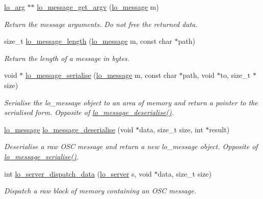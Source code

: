 \begin{DoxyCompactItemize}
\hyperlink{unionlo__arg}{lo\+\_\+arg} $\ast$$\ast$ \hyperlink{group__liblolowlevel_gab28b48cdbefb60eb7e57557ae9d23171}{lo\+\_\+message\+\_\+get\+\_\+argv} (\hyperlink{lo__types_8h_ad126083c98d941f00eb72d1690b38d63}{lo\+\_\+message} m)
\begin{DoxyCompactList}\small\item\em Return the message arguments. Do not free the returned data. \end{DoxyCompactList}\item 
size\+\_\+t \hyperlink{group__liblolowlevel_ga0855039d071b7031727213272857c27e}{lo\+\_\+message\+\_\+length} (\hyperlink{lo__types_8h_ad126083c98d941f00eb72d1690b38d63}{lo\+\_\+message} m, const char $\ast$path)
\begin{DoxyCompactList}\small\item\em Return the length of a message in bytes. \end{DoxyCompactList}\item 
void $\ast$ \hyperlink{group__liblolowlevel_ga5a14045edea33d63792e9a4c82e13b02}{lo\+\_\+message\+\_\+serialise} (\hyperlink{lo__types_8h_ad126083c98d941f00eb72d1690b38d63}{lo\+\_\+message} m, const char $\ast$path, void $\ast$to, size\+\_\+t $\ast$size)
\begin{DoxyCompactList}\small\item\em Serialise the lo\+\_\+message object to an area of memory and return a pointer to the serialised form. Opposite of \hyperlink{group__liblolowlevel_ga2f4644b2a1aae0d0eee456fe93ac158e}{lo\+\_\+message\+\_\+deserialise()}. \end{DoxyCompactList}\item 
\hyperlink{lo__types_8h_ad126083c98d941f00eb72d1690b38d63}{lo\+\_\+message} \hyperlink{group__liblolowlevel_ga2f4644b2a1aae0d0eee456fe93ac158e}{lo\+\_\+message\+\_\+deserialise} (void $\ast$data, size\+\_\+t size, int $\ast$result)
\begin{DoxyCompactList}\small\item\em Deserialise a raw O\+S\+C message and return a new lo\+\_\+message object. Opposite of \hyperlink{group__liblolowlevel_ga5a14045edea33d63792e9a4c82e13b02}{lo\+\_\+message\+\_\+serialise()}. \end{DoxyCompactList}\item 
int \hyperlink{group__liblolowlevel_ga9e96445401c94c3751de27f8db1a0b50}{lo\+\_\+server\+\_\+dispatch\+\_\+data} (\hyperlink{lo__types_8h_a59067bf50cf8abb4371da6f03c9036c9}{lo\+\_\+server} s, void $\ast$data, size\+\_\+t size)
\begin{DoxyCompactList}\small\item\em Dispatch a raw block of memory containing an O\+S\+C message. \end{DoxyCompactList}\item 
$$
\end{DoxyCompactItemize}

